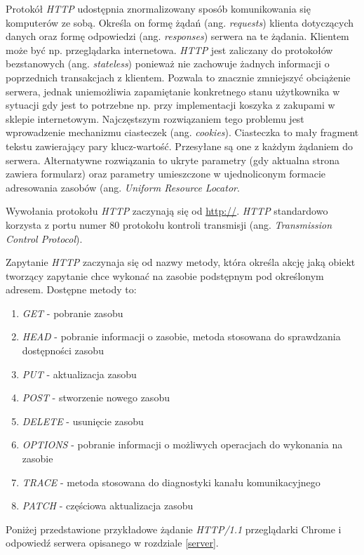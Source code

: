 \documentclass[polish, twoside, 12pt]{mwart}
\begin{document}
Protokół \emph{HTTP} udostępnia znormalizowany sposób komunikowania się komputerów ze sobą. Określa on formę żądań (ang. \emph{requests}) klienta dotyczących danych oraz formę odpowiedzi (ang. \emph{responses}) serwera na te żądania. Klientem może być np. przeglądarka internetowa.  \emph{HTTP} jest zaliczany do protokołów bezstanowych (ang. \emph{stateless}) ponieważ nie zachowuje żadnych informacji o poprzednich transakcjach z klientem. Pozwala to znacznie zmniejszyć obciążenie serwera, jednak uniemożliwia zapamiętanie konkretnego stanu użytkownika w sytuacji gdy jest to potrzebne np. przy implementacji koszyka z zakupami w sklepie internetowym. Najczęstszym rozwiązaniem tego problemu jest wprowadzenie mechanizmu ciasteczek (ang. \emph{cookies}). Ciasteczka to mały fragment tekstu zawierający pary klucz-wartość. Przesyłane są one z każdym żądaniem do serwera. Alternatywne rozwiązania to ukryte parametry (gdy aktualna strona zawiera formularz) oraz parametry umieszczone w ujednoliconym formacie adresowania zasobów (ang. \emph{Uniform Resource Locator}.

Wywołania protokołu \emph{HTTP} zaczynają się od \url{http://}. \emph{HTTP} standardowo korzysta z portu numer 80 protokołu kontroli transmisji (ang. \emph{Transmission Control Protocol}).

Zapytanie \emph{HTTP} zaczynaja się od nazwy metody, która określa akcję jaką obiekt tworzący zapytanie chce wykonać na zasobie podstępnym pod określonym adresem. Dostępne metody to:

\begin{enumerate}
  \item \emph{GET} - pobranie zasobu
  \item \emph{HEAD} - pobranie informacji o zasobie, metoda stosowana do sprawdzania dostępności zasobu
  \item \emph{PUT} - aktualizacja zasobu
  \item \emph{POST} - stworzenie nowego zasobu
  \item \emph{DELETE} - usunięcie zasobu
  \item \emph{OPTIONS} - pobranie informacji o możliwych operacjach do wykonania na zasobie
  \item \emph{TRACE} - metoda stosowana do diagnostyki kanału komunikacyjnego
  \item \emph{PATCH} - częściowa aktualizacja zasobu
\end{enumerate}

Poniżej przedstawione przykładowe żądanie \emph{HTTP/1.1} przeglądarki Chrome i odpowiedź serwera opisanego w rozdziale \ref{server}.
\end{document}
